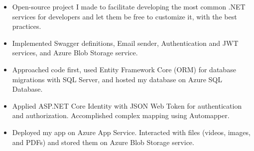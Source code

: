 \documentclass[10pt,a4paper,ragged2e,withhyper]{altacv}
\begin{document}
\begin{paracol}{2}
\divider

\begin{itemize}
\item Open-source project I made to facilitate developing the most common .NET services for developers and let them be free to customize it, with the best practices.
\item Implemented Swagger definitions, Email sender, Authentication and JWT services, and Azure Blob Storage service.
\end{itemize}

\divider

\begin{itemize}
\item Approached code first, used Entity Framework Core (ORM) for database migrations with SQL Server, and hosted my database on Azure SQL Database.
\item Applied ASP.NET Core Identity with JSON Web Token for authentication and authorization. Accomplished complex mapping using Automapper.
\item Deployed my app on Azure App Service. Interacted with files (videos, images, and PDFs) and stored them on Azure Blob Storage service.
\end{itemize}

\medskip

\switchcolumn




\divider
{}
\divider
{}
\divider
{}
\divider
{}
\divider


\end{paracol}
\end{document}
